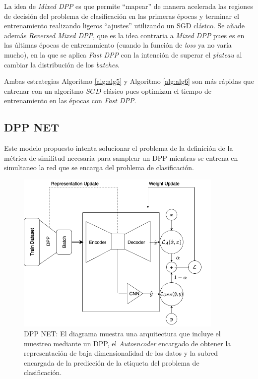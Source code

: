 La idea de \textit{Mixed DPP} es que permite ``mapear'' de manera acelerada las regiones de decisión del problema de clasificación en las primeras épocas y terminar el entrenamiento realizando ligeros ``ajustes'' utilizando un SGD clásico. Se añade además \textit{Reversed Mixed DPP}, que es la idea contraria a \textit{Mixed DPP} pues es en las últimas épocas de entrenamiento (cuando la función de \textit{loss} ya no varía mucho), en la que se aplica \textit{Fast DPP} con la intención de superar el \textit{plateau} al cambiar la distribución de los \textit{batches}. 


\vspace{0.2cm}

Ambas estrategias Algoritmo \ref{alg:alg5} y Algoritmo \ref{alg:alg6} son más rápidas que entrenar con un algoritmo $SGD$ clásico pues optimizan el tiempo de entrenamiento en las épocas con \textit{Fast DPP}. 

\subsection{DPP NET}

Este modelo propuesto intenta solucionar el problema de la definición de la métrica de similitud necesaria para samplear un DPP mientras se entrena en simultaneo la red que se encarga del problema de clasificación. 

\begin{figure}[ht]
    \centering
    \includegraphics[width=10cm]{img/tesis/dpp_net.png}
    \caption{DPP NET: El diagrama muestra una arquitectura que incluye el muestreo mediante un DPP, el \textit{Autoencoder} encargado de obtener la representación de baja dimensionalidad de los datos y la subred encargada de la predicción de la etiqueta del problema de clasificación.}
    \label{fig:dpp_net}
\end{figure}

